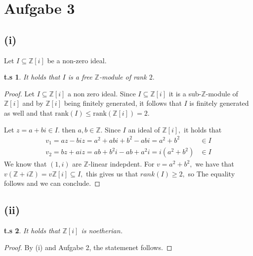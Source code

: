 \documentclass[10pt,a4paper]{article}
\newtheorem*{zz*}{t.s}
\newcommand{\ZZ}{\mathbb{Z}}
\begin{document}
	\section*{Aufgabe 3}
	\subsection*{(i)}
	Let $I\subseteq \ZZ[i]$ be a non-zero ideal.
	\begin{zz*}
		It holds that $I$ is a free $\ZZ$-module of rank $2.$
	\end{zz*}
	\begin{proof}
		Let $I\subseteq \ZZ[i]$ a non zero ideal. Since $I\subseteq \ZZ[i]$ it is a sub-$\ZZ$-module of $\ZZ[i]$ and by $\ZZ[i]$ being finitely generated, it follows that $I$ is finitely generated as well and that $\mathrm{rank}(I)\leq \mathrm{rank}(\ZZ[i]) = 2.$
		
		Let $z = a+bi\in I.$ then $a,b\in \ZZ.$ Since $I$ an ideal of $\ZZ[i],$ it holds that
		\[\begin{split}
			v_1 = az -biz = a^2  +abi +b^2-abi = a^2+b^2&\in I\\
			v_2 = bz +aiz = ab + b^2i -ab +a^2i = i(a^2 + b^2)&\in I
		\end{split}\]
		We know that $(1,i)$ are $\ZZ$-linear indepdent. For $v = a^2+b^2,$ we have that $v\left(\ZZ + i\ZZ\right) = v\ZZ[i]\subseteq I,$ this gives us that $rank(I)\geq 2,$ so The equality follows and we can conclude. 
	\end{proof}
	
	\subsection*{(ii)}
	\begin{zz*}
		It holds that $\ZZ[i]$ is noetherian.
	\end{zz*}
	\begin{proof}
		By (i) and Aufgabe 2, the statemenet follows.
	\end{proof}
	\pagebreak
\end{document}
